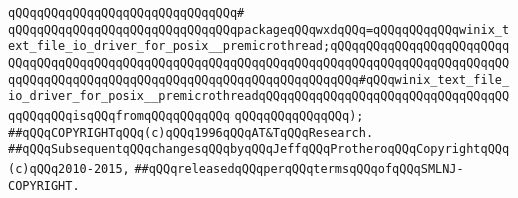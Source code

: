 \verb|qQQqqQQqqQQqqQQqqQQqqQQqqQQqqQQq#|\newline
\verb|qQQqqQQqqQQqqQQqqQQqqQQqqQQqqQQqpackageqQQqwxdqQQq=qQQqqQQqqQQqwinix_text_file_io_driver_for_posix__premicrothread;qQQqqQQqqQQqqQQqqQQqqQQqqQQqqQQqqQQqqQQqqQQqqQQqqQQqqQQqqQQqqQQqqQQqqQQqqQQqqQQqqQQqqQQqqQQqqQQqqQQqqQQqqQQqqQQqqQQqqQQqqQQqqQQqqQQqqQQqqQQqqQQq#qQQqwinix_text_file_io_driver_for_posix__premicrothreadqQQqqQQqqQQqqQQqqQQqqQQqqQQqqQQqqQQqqQQqqQQqisqQQqfromqQQqqQQqqQQq|\newline
\verb|qQQqqQQqqQQqqQQq);|\newline
\newline
\newline
\verb|##qQQqCOPYRIGHTqQQq(c)qQQq1996qQQqAT&TqQQqResearch.|\newline
\verb|##qQQqSubsequentqQQqchangesqQQqbyqQQqJeffqQQqProtheroqQQqCopyrightqQQq(c)qQQq2010-2015,|\newline
\verb|##qQQqreleasedqQQqperqQQqtermsqQQqofqQQqSMLNJ-COPYRIGHT.|\newline

